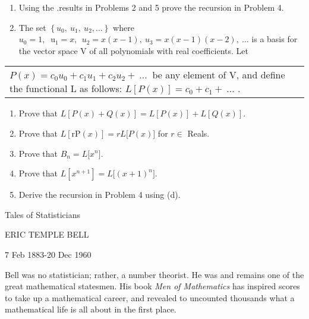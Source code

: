 \documentclass[10pt,letter]{article}
\renewenvironment{quote}
  {\begin{tabular}{|p{13cm}}}
  {\end{tabular}}
\begin{document}
\begin{enumerate}
\def\labelenumi{\arabic{enumi}.}

\item
  Using the .results in Problems 2 and 5 prove the recursion in Problem
  4.
\item
  The set \(\left\{ u_{0},\ u_{1},\ u_{2},\ldots \right\}\) where
  \(u_{0} = 1,\ \text{\ u}_{1} = x,\ \ u_{2} = x\left( x - 1 \right),\ u_{3} = x\left( x - 1 \right)\left( x - 2 \right),\ \ldots\)
  is a basis for the vector space V of all polynomials with real
  coefficients. Let

\end{enumerate}
\begin{quote}
\(P\left( x \right) = c_{0}u_{0} + c_{1}u_{1} + c_{2}u_{2} + \ \ldots\ \)
be any element of V, and define the functional L as follows:
\(L\left\lbrack P\left( x \right) \right\rbrack = c_{0} + c_{1} + \ \ldots\)
.

\end{quote}
\begin{enumerate}
\def\labelenumi{\alph{enumi}.}

\item
  Prove that
  \(L\left\lbrack P\left( x \right) + Q\left( x \right) \right\rbrack = L\left\lbrack P\left( x \right) \right\rbrack + L\left\lbrack Q\left( x \right) \right\rbrack.\)
\item
  Prove that
  \(L\left\lbrack \text{rP}\left( x \right) \right\rbrack = rL\lbrack P\left( x \right)\rbrack\)
  for \(r \in\) Reals.
\item
  Prove that \(B_{n} = L\lbrack x^{n}\rbrack\).
\item
  Prove that
  \(L\left\lbrack x^{n + 1} \right\rbrack = L\lbrack\left( x + 1 \right)^{n}\rbrack\).
\item
  Derive the recursion in Problem 4 using (d).

\end{enumerate}

Tales of Statisticians

ERIC TEMPLE BELL

7 Feb 1883-20 Dec 1960

Bell was no statistician; rather, a number theorist. He was and remains
one of the great mathematical statesmen. His book \emph{Men of
Mathematics} has inspired scores to take up a mathematical career, and
revealed to uncounted thousands what a mathematical life is all about in
the first place.
\end{document}

